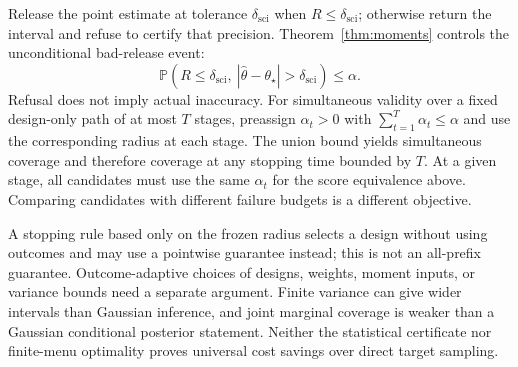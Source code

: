 \documentclass[11pt]{article}
\theoremstyle{remark}
\newcommand{\Prob}{\mathbb P}
\newcommand{\sci}{\delta_{\mathrm{sci}}}
\begin{document}
Release the point estimate at tolerance $\sci$ when $R\le\sci$; otherwise return the interval and refuse to certify that precision. Theorem~\ref{thm:moments} controls the unconditional bad-release event:
\[
 \Prob(R\le\sci,\ |\widehat\theta-\theta_\star|>\sci)\le\alpha.
\]
Refusal does not imply actual inaccuracy. For simultaneous validity over a fixed design-only path of at most $T$ stages, preassign $\alpha_t>0$ with $\sum_{t=1}^T\alpha_t\le\alpha$ and use the corresponding radius at each stage. The union bound yields simultaneous coverage and therefore coverage at any stopping time bounded by $T$. At a given stage, all candidates must use the same $\alpha_t$ for the score equivalence above. Comparing candidates with different failure budgets is a different objective.

A stopping rule based only on the frozen radius selects a design without using outcomes and may use a pointwise guarantee instead; this is not an all-prefix guarantee. Outcome-adaptive choices of designs, weights, moment inputs, or variance bounds need a separate argument. Finite variance can give wider intervals than Gaussian inference, and joint marginal coverage is weaker than a Gaussian conditional posterior statement. Neither the statistical certificate nor finite-menu optimality proves universal cost savings over direct target sampling.
\end{document}

